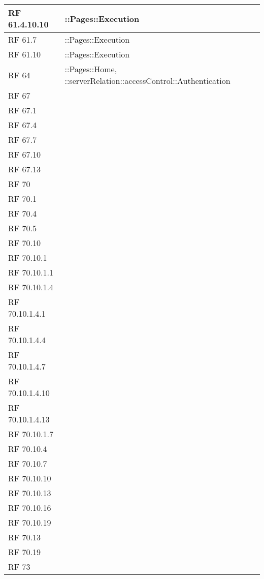 {\begin{longtable} [c]{| p{2cm} | p{13cm} |}
 \hline 
RF 61.4.10.10 & ::\-Pages::\-Execution\\ 
 \hline 
RF 61.7 & ::\-Pages::\-Execution\\ 
 \hline 
RF 61.10 & ::\-Pages::\-Execution\\ 
 \hline 
RF 64 & ::\-Pages::\-Home, ::\-serverRelation::\-accessControl::\-Authentication\\ 
 \hline 
RF 67 & \\ 
 \hline 
RF 67.1 & \\ 
 \hline 
RF 67.4 & \\ 
 \hline 
RF 67.7 & \\ 
 \hline 
RF 67.10 & \\ 
 \hline 
RF 67.13 & \\ 
 \hline 
RF 70 & \\ 
 \hline 
RF 70.1 & \\ 
 \hline 
RF 70.4 & \\ 
 \hline 
RF 70.5 & \\ 
 \hline 
RF 70.10 & \\ 
 \hline 
RF 70.10.1 & \\ 
 \hline 
RF 70.10.1.1 & \\ 
 \hline 
RF 70.10.1.4 & \\ 
 \hline 
RF 70.10.1.4.1 & \\ 
 \hline 
RF 70.10.1.4.4 & \\ 
 \hline 
RF 70.10.1.4.7 & \\ 
 \hline 
RF 70.10.1.4.10 & \\ 
 \hline 
RF 70.10.1.4.13 & \\ 
 \hline 
RF 70.10.1.7 & \\ 
 \hline 
RF 70.10.4 & \\ 
 \hline 
RF 70.10.7 & \\ 
 \hline 
RF 70.10.10 & \\ 
 \hline 
RF 70.10.13 & \\ 
 \hline 
RF 70.10.16 & \\ 
 \hline 
RF 70.10.19 & \\ 
 \hline 
RF 70.13 & \\ 
 \hline 
RF 70.19 & \\ 
 \hline 
RF 73 & \\ 
 \hline 
\end{longtable}}